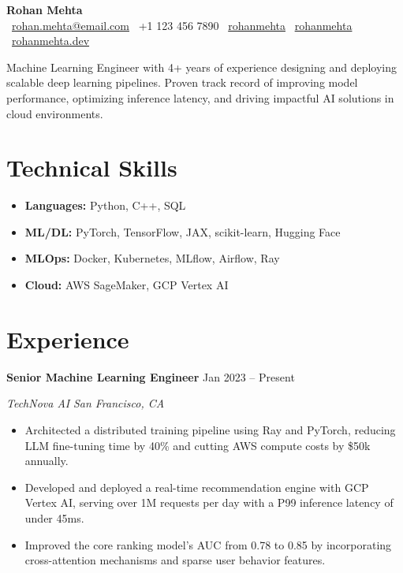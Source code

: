 \documentclass[10pt,a4paper]{article}
\newcommand{\resumeHeading}[4]{
  \vspace{0.2em}\noindent
  \textbf{#1} \hfill #2 \par
  \vspace{-0.1em}\noindent
  \textit{#3} \hfill \textit{#4} \par
}
\begin{document}
\begin{center}
    {\Huge \textbf{Rohan Mehta}} \\[0.5em]
    \faEnvelope\ \href{mailto:rohan.mehta@email.com}{rohan.mehta@email.com} \quad
    \faPhone\ +1 123 456 7890 \quad
    \faLinkedin\ \href{https://linkedin.com/in/rohanmehta}{rohanmehta} \quad
    \faGithub\ \href{https://github.com/rohanmehta}{rohanmehta} \quad
    \faGlobe\ \href{https://rohanmehta.dev}{rohanmehta.dev}
\end{center}

\vspace{0.5em}
\noindent Machine Learning Engineer with 4+ years of experience designing and deploying scalable deep learning pipelines. Proven track record of improving model performance, optimizing inference latency, and driving impactful AI solutions in cloud environments.

\section*{Technical Skills}
\begin{itemize}[leftmargin=0.15in, label={}, itemsep=0.1em, parsep=0pt]
    \item \textbf{Languages:} Python, C++, SQL
    \item \textbf{ML/DL:} PyTorch, TensorFlow, JAX, scikit-learn, Hugging Face
    \item \textbf{MLOps:} Docker, Kubernetes, MLflow, Airflow, Ray
    \item \textbf{Cloud:} AWS SageMaker, GCP Vertex AI
\end{itemize}

\section*{Experience}

\resumeHeading{Senior Machine Learning Engineer}{Jan 2023 -- Present}{TechNova AI}{San Francisco, CA}
\vspace{-0.3em}
\begin{itemize}[leftmargin=0.15in, itemsep=0.1em, parsep=0pt]
    \item Architected a distributed training pipeline using Ray and PyTorch, reducing LLM fine-tuning time by 40\% and cutting AWS compute costs by \$50k annually.
    \item Developed and deployed a real-time recommendation engine with GCP Vertex AI, serving over 1M requests per day with a P99 inference latency of under 45ms.
    \item Improved the core ranking model's AUC from 0.78 to 0.85 by incorporating cross-attention mechanisms and sparse user behavior features.
\end{itemize}
\end{document}
